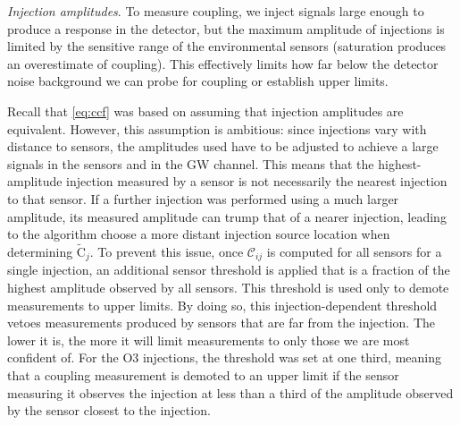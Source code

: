 \textit{Injection amplitudes}. To measure coupling, we inject signals large enough to produce a response in the detector, but the maximum amplitude of injections is limited by the sensitive range of the environmental sensors (saturation produces an overestimate of coupling).
This effectively limits how far below the detector noise background we can probe for coupling or establish upper limits.

Recall that \cref{eq:ccf} was based on assuming that injection amplitudes are equivalent.
However, this assumption is ambitious: since injections vary with distance to sensors, the amplitudes used have to be adjusted to achieve a large signals in the sensors and in the \ac{GW} channel.
This means that the highest-amplitude injection measured by a sensor is not necessarily the nearest injection to that sensor.
If a further injection was performed using a much larger amplitude, its measured amplitude can trump that of a nearer injection, leading to the algorithm choose a more distant injection source location when determining $\widetilde{\mathrm{C}}_j$.
To prevent this issue, once $\mathcal{C}_{ij}$ is computed for all sensors for a single injection, an additional sensor threshold is applied that is a fraction of the highest amplitude observed by all sensors.
This threshold is used only to demote measurements to upper limits.
By doing so, this injection-dependent threshold vetoes measurements produced by sensors that are far from the injection.
The lower it is, the more it will limit measurements to only those we are most confident of.
For the \ac{O3} injections, the threshold was set at one third, meaning that a coupling measurement is demoted to an upper limit if the sensor measuring it observes the injection at less than a third of the amplitude observed by the sensor closest to the injection.

%


